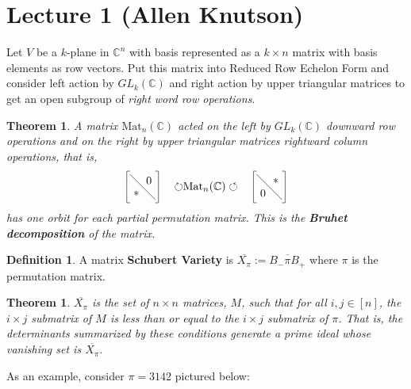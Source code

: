 \documentclass[12pt]{amsart}
\numberwithin{equation}{section}
\newtheorem{Theorem}[equation]{Theorem}
\theoremstyle{definition}
\newtheorem{Definition}[equation]{Definition}
\numberwithin{figure}{section}
\newcommand{\C}{\mathbb{C}}
\begin{document}
\section{Lecture 1 (Allen Knutson)}

Let $V$ be a $k$-plane in $\C^n$ with basis represented as a $k\times n$ matrix with basis elements as row vectors. Put this matrix into Reduced Row Echelon Form and consider left action by $GL_k(\C)$ and right action by upper triangular matrices to get an open subgroup of \textit{right word row operations}.

\begin{Theorem}
A matrix $\text{Mat}_n(\C)$ acted on the left by $GL_k(\C)$ downward row operations and  on the right by upper triangular matrices rightward column operations, that is,
$$\begin{tikzpicture}
\node (a) at (.3,.3) {$*$};
\node (b) at (.7,.7) {$0$};
\draw [-] (.9,.1) to (.1,.9);
\draw[-] (0,0) to (0,1);
\draw[-] (1,0) to (1,1);
\draw[-] (0,0) to (.1,0);
\draw[-] (0,1) to (.1,1);
\draw[-] (.9,0) to (1,0);
\draw[-] (.9,1) to (1,1);
\node (c) at (2.5,.5) {$\circlearrowright$Mat$_n(\C)\circlearrowleft$};
\node (a) at (4.3,.3) {$0$};
\node (b) at (4.7,.7) {$*$};
\draw [-] (4.9,.1) to (4.1,.9);
\draw[-] (4,0) to (4,1);
\draw[-] (5,0) to (5,1);
\draw[-] (4,0) to (4.1,0);
\draw[-] (4,1) to (4.1,1);
\draw[-] (4.9,0) to (5,0);
\draw[-] (4.9,1) to (5,1);
\end{tikzpicture}$$
 has one orbit for each partial permutation matrix. This is the \textbf{Bruhet decomposition} of the matrix.
\end{Theorem}

\begin{Definition}
A matrix \textbf{Schubert Variety} is $\overline{X_{\pi}}:=\overline{B_-\pi B_+}$ where $\pi$ is the permutation matrix.
\end{Definition}

\begin{Theorem}
$\overline{X_\pi}$ is the set of $n\times n$ matrices, $M$, such that for all $i,j\in[n]$, the $i\times j$ submatrix of $M$ is less than or equal to the $i\times j$ submatrix of $\pi$. That is, the determinants summarized by these conditions generate a prime ideal whose vanishing set is $\overline{X_\pi}$.
\end{Theorem}

As an example, consider $\pi=3142$ pictured below:
\end{document}

